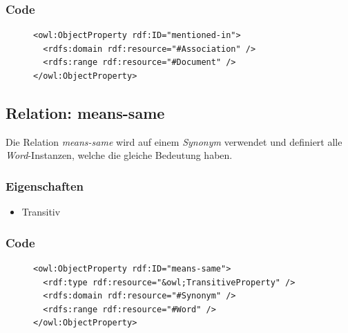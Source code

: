 \documentclass[
    11pt,
    latin1,
    a4paper,
    oneside
]{scrreprt}
\begin{document}
\subsubsection{Code} \label{sec:rel_mentionedin_code}

\begin{figure}[H]
 \lstset{language=XML}
 \begin{lstlisting}[label=owl:mentionedin,caption={Die Relation \emph{mentioned-in} gibt alle \emph{Document} an, in welcher eine \emph{Association} erw\"ahnt wird}]
<owl:ObjectProperty rdf:ID="mentioned-in">
  <rdfs:domain rdf:resource="#Association" />
  <rdfs:range rdf:resource="#Document" />
</owl:ObjectProperty>
 \end{lstlisting}
\end{figure}


\subsection{Relation: means-same} \label{sec:rel_meanssame}

Die Relation \emph{means-same} wird auf einem \emph{Synonym} verwendet und definiert alle \emph{Word}-Instanzen, welche die gleiche Bedeutung haben.

\subsubsection{Eigenschaften} \label{sec:rel_meanssame_settings}

\begin{itemize}
  \item Transitiv
\end{itemize}

\subsubsection{Code} \label{sec:rel_meanssame_code}

\begin{figure}[H]
 \lstset{language=XML}
 \begin{lstlisting}[label=owl:meanssame,caption={Die Relation \emph{means-same} definiert auf \emph{Synonym}-Instanzen alle W\"orter}]
<owl:ObjectProperty rdf:ID="means-same">
  <rdf:type rdf:resource="&owl;TransitiveProperty" />
  <rdfs:domain rdf:resource="#Synonym" />
  <rdfs:range rdf:resource="#Word" />
</owl:ObjectProperty>
 \end{lstlisting}
\end{figure}
\end{document}
